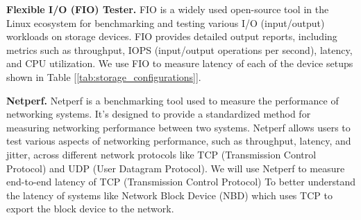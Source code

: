 \documentclass[nonacm,sigplan]{acmart}
\begin{document}
\textbf{Flexible I/O (FIO) Tester.}
FIO is a widely used open-source tool in the Linux ecosystem for benchmarking
and testing various I/O (input/output) workloads on storage devices. FIO
provides detailed output reports, including metrics such as throughput, IOPS
(input/output operations per second), latency, and CPU utilization. We use FIO to measure latency of each of the device setups shown in Table [\ref{tab:storage_configurations}]. 

\begin{table}[h!]
\centering
{}
\caption{Storage device setups.}
\label{tab:storage_configurations}
\end{table}

\textbf{Netperf.} 
Netperf is a benchmarking tool used to measure the performance of networking
systems. It's designed to provide a standardized method for measuring networking
performance between two systems. Netperf allows users to test various aspects of
networking performance, such as throughput, latency, and jitter, across
different network protocols like TCP (Transmission Control Protocol) and UDP
(User Datagram Protocol). We will use Netperf to measure end-to-end latency of
TCP (Transmission Control Protocol) To better understand the latency of systems
like Network Block Device (NBD) which uses TCP to export the block device to the
network.
\end{document}
